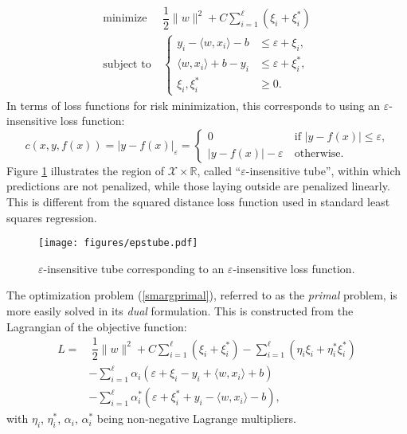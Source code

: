 \documentclass[12pt]{report}
\begin{document}
\begin{equation} \label{smargprimal}
\begin{split}
\text{minimize} &\ \dfrac{1}{2}\| w \|^2 + C\sum_{i=1}^{\ell}(\xi_{i} + \xi_{i}^{*}) \\
\text{subject to} &\ \begin{cases}
y_{i} - \langle w,x_{i} \rangle - b &\leq \varepsilon + \xi_{i} \text{,}\\
\langle w,x_{i} \rangle + b - y_{i} &\leq \varepsilon + \xi_{i}^{*} \text{,}\\
\xi_{i}, \xi_{i}^{*} &\geq 0 \text{.}
\end{cases}
\end{split}
\end{equation}
In terms of loss functions for risk minimization, this corresponds to using an $ \varepsilon $-insensitive loss function:
\begin{equation} \label{epsloss}
c(x,y,f(x)) = \vert y - f(x) \vert_{\varepsilon} = \begin{cases}
0 &\ \text{if } \vert y - f(x) \vert \leq \varepsilon \text{,}\\
\vert y - f(x) \vert - \varepsilon &\ \text{otherwise} \text{.}
\end{cases}
\end{equation}
Figure \ref{epstubefig} illustrates the region of $ \mathcal{X} \times \mathbb{R} $, called ``$ \varepsilon $-insensitive tube'', within which predictions are not penalized, while those laying outside are penalized linearly. This is different from the squared distance loss function used in standard least squares regression.

\begin{figure}[h]
  \centering
  	\texttt{[image: figures/epstube.pdf]}
  \caption{$\varepsilon$-insensitive tube corresponding to an $\varepsilon$-insensitive loss function.}
  \label{epstubefig}
\end{figure}

The optimization problem (\ref{smargprimal}), referred to as the \textit{primal} problem, is more easily solved in its \textit{dual} formulation. This is constructed from the Lagrangian of the objective function:
\begin{equation} \label{lagrangian}
\begin{split}
L =& \ \dfrac{1}{2}\| w \|^2 + C\sum_{i=1}^{\ell}(\xi_{i} + \xi_{i}^{*}) - \sum_{i=1}^{\ell}(\eta_{i}\xi_{i} + \eta_{i}^{*}\xi_{i}^{*}) \\
&- \sum_{i=1}^{\ell}\alpha_{i}(\varepsilon + \xi_{i} - y_{i} + \langle w,x_{i} \rangle + b) \\
&- \sum_{i=1}^{\ell}\alpha_{i}^{*}(\varepsilon + \xi_{i}^{*} + y_{i} - \langle w,x_{i} \rangle - b) \text{,}
\end{split}
\end{equation}
with $ \eta_{i} $, $ \eta_{i}^{*} $, $ \alpha_{i} $, $ \alpha_{i}^{*} $ being non-negative Lagrange multipliers.
\end{document}
